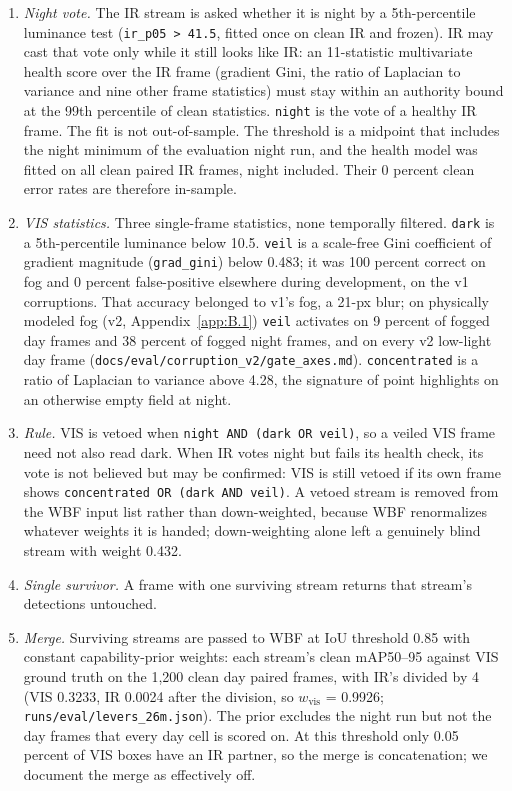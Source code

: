 \documentclass[journal,onecolumn]{IEEEtran}
\begin{document}
\begin{enumerate}
\item \emph{Night vote.} The IR stream is asked whether it is night by a 5th-percentile luminance test (\texttt{ir\_\allowbreak{}p05 > 41.5}, fitted once on clean IR and frozen). IR may cast that vote only while it still looks like IR: an 11-statistic multivariate health score over the IR frame (gradient Gini, the ratio of Laplacian to variance and nine other frame statistics) must stay within an authority bound at the 99th percentile of clean statistics. \texttt{night} is the vote of a healthy IR frame. The fit is not out-of-sample. The threshold is a midpoint that includes the night minimum of the evaluation night run, and the health model was fitted on all clean paired IR frames, night included. Their 0 percent clean error rates are therefore in-sample.
\item \emph{VIS statistics.} Three single-frame statistics, none temporally filtered. \texttt{dark} is a 5th-percentile luminance below 10.5. \texttt{veil} is a scale-free Gini coefficient of gradient magnitude (\texttt{grad\_\allowbreak{}gini}) below 0.483; it was 100 percent correct on fog and 0 percent false-positive elsewhere during development, on the v1 corruptions. That accuracy belonged to v1's fog, a 21-px blur; on physically modeled fog (v2, Appendix~\ref{app:B.1}) \texttt{veil} activates on 9 percent of fogged day frames and 38 percent of fogged night frames, and on every v2 low-light day frame (\texttt{docs/\allowbreak{}eval/\allowbreak{}corruption\_\allowbreak{}v2/\allowbreak{}gate\_\allowbreak{}axes.md}). \texttt{concentrated} is a ratio of Laplacian to variance above 4.28, the signature of point highlights on an otherwise empty field at night.
\item \emph{Rule.} VIS is vetoed when \texttt{night AND (dark OR veil)}, so a veiled VIS frame need not also read dark. When IR votes night but fails its health check, its vote is not believed but may be confirmed: VIS is still vetoed if its own frame shows \texttt{concentrated OR (dark AND veil)}. A vetoed stream is removed from the WBF input list rather than down-weighted, because WBF renormalizes whatever weights it is handed; down-weighting alone left a genuinely blind stream with weight 0.432.
\item \emph{Single survivor.} A frame with one surviving stream returns that stream's detections untouched.
\item \emph{Merge.} Surviving streams are passed to WBF at IoU threshold 0.85 with constant capability-prior weights: each stream's clean mAP50--95 against VIS ground truth on the 1,200 clean day paired frames, with IR's divided by 4 (VIS 0.3233, IR 0.0024 after the division, so $w_{\mathrm{vis}}$ = 0.9926; \texttt{runs/\allowbreak{}eval/\allowbreak{}levers\_\allowbreak{}26m.json}). The prior excludes the night run but not the day frames that every day cell is scored on. At this threshold only 0.05 percent of VIS boxes have an IR partner, so the merge is concatenation; we document the merge as effectively off.

\end{enumerate}
\end{document}
